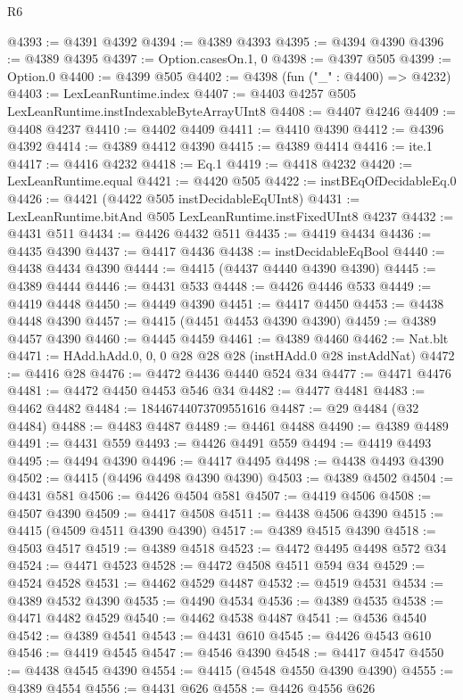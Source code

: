 \begin{lexlean}{R6}
\begin{coremodule}
@4393 := @4391 @4392
@4394 := @4389 @4393
@4395 := @4394 @4390
@4396 := @4389 @4395
@4397 := Option.casesOn.{1, 0}
@4398 := @4397 @505
@4399 := Option.{0}
@4400 := @4399 @505
@4402 := @4398 (fun ("_" : @4400) => @4232)
@4403 := LexLeanRuntime.index
@4407 := @4403 @4257 @505 LexLeanRuntime.instIndexableByteArrayUInt8
@4408 := @4407 @4246
@4409 := @4408 @4237
@4410 := @4402 @4409
@4411 := @4410 @4390
@4412 := @4396 @4392
@4414 := @4389 @4412 @4390
@4415 := @4389 @4414
@4416 := ite.{1}
@4417 := @4416 @4232
@4418 := Eq.{1}
@4419 := @4418 @4232
@4420 := LexLeanRuntime.equal
@4421 := @4420 @505
@4422 := instBEqOfDecidableEq.{0}
@4426 := @4421 (@4422 @505 instDecidableEqUInt8)
@4431 := LexLeanRuntime.bitAnd @505 LexLeanRuntime.instFixedUInt8 @4237
@4432 := @4431 @511
@4434 := @4426 @4432 @511
@4435 := @4419 @4434
@4436 := @4435 @4390
@4437 := @4417 @4436
@4438 := instDecidableEqBool
@4440 := @4438 @4434 @4390
@4444 := @4415 (@4437 @4440 @4390 @4390)
@4445 := @4389 @4444
@4446 := @4431 @533
@4448 := @4426 @4446 @533
@4449 := @4419 @4448
@4450 := @4449 @4390
@4451 := @4417 @4450
@4453 := @4438 @4448 @4390
@4457 := @4415 (@4451 @4453 @4390 @4390)
@4459 := @4389 @4457 @4390
@4460 := @4445 @4459
@4461 := @4389 @4460
@4462 := Nat.blt
@4471 := HAdd.hAdd.{0, 0, 0} @28 @28 @28 (instHAdd.{0} @28 instAddNat)
@4472 := @4416 @28
@4476 := @4472 @4436 @4440 @524 @34
@4477 := @4471 @4476
@4481 := @4472 @4450 @4453 @546 @34
@4482 := @4477 @4481
@4483 := @4462 @4482
@4484 := 18446744073709551616
@4487 := @29 @4484 (@32 @4484)
@4488 := @4483 @4487
@4489 := @4461 @4488
@4490 := @4389 @4489
@4491 := @4431 @559
@4493 := @4426 @4491 @559
@4494 := @4419 @4493
@4495 := @4494 @4390
@4496 := @4417 @4495
@4498 := @4438 @4493 @4390
@4502 := @4415 (@4496 @4498 @4390 @4390)
@4503 := @4389 @4502
@4504 := @4431 @581
@4506 := @4426 @4504 @581
@4507 := @4419 @4506
@4508 := @4507 @4390
@4509 := @4417 @4508
@4511 := @4438 @4506 @4390
@4515 := @4415 (@4509 @4511 @4390 @4390)
@4517 := @4389 @4515 @4390
@4518 := @4503 @4517
@4519 := @4389 @4518
@4523 := @4472 @4495 @4498 @572 @34
@4524 := @4471 @4523
@4528 := @4472 @4508 @4511 @594 @34
@4529 := @4524 @4528
@4531 := @4462 @4529 @4487
@4532 := @4519 @4531
@4534 := @4389 @4532 @4390
@4535 := @4490 @4534
@4536 := @4389 @4535
@4538 := @4471 @4482 @4529
@4540 := @4462 @4538 @4487
@4541 := @4536 @4540
@4542 := @4389 @4541
@4543 := @4431 @610
@4545 := @4426 @4543 @610
@4546 := @4419 @4545
@4547 := @4546 @4390
@4548 := @4417 @4547
@4550 := @4438 @4545 @4390
@4554 := @4415 (@4548 @4550 @4390 @4390)
@4555 := @4389 @4554
@4556 := @4431 @626
@4558 := @4426 @4556 @626

\end{coremodule}
\end{lexlean}
